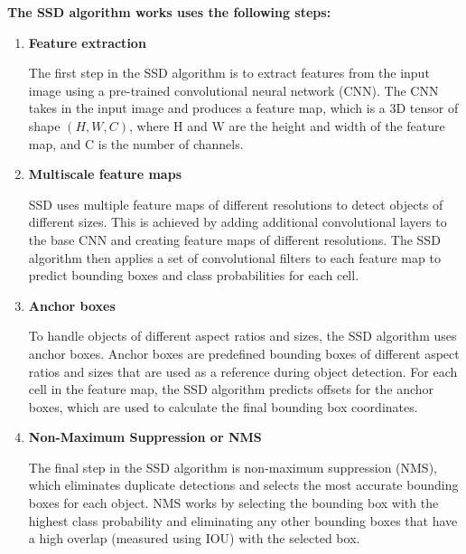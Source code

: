 \textbf{The SSD algorithm works uses the following steps:}
\begin{enumerate}

    \item \textbf{Feature extraction}

          The first step in the SSD algorithm is to extract features from the input image
          using a pre-trained convolutional neural network (CNN). The CNN takes in the
          input image and produces a feature map, which is a 3D tensor of shape \((H, W,
          C)\), where H and W are the height and width of the feature map, and C is the
          number of channels.

    \item \textbf{Multiscale feature maps}

          SSD uses multiple feature maps of different resolutions to detect objects of
          different sizes. This is achieved by adding additional convolutional layers to
          the base CNN and creating feature maps of different resolutions. The SSD
          algorithm then applies a set of convolutional filters to each feature map to
          predict bounding boxes and class probabilities for each cell.

    \item \textbf{Anchor boxes}

          To handle objects of different aspect ratios and sizes, the SSD algorithm uses
          anchor boxes. Anchor boxes are predefined bounding boxes of different aspect
          ratios and sizes that are used as a reference during object detection. For each
          cell in the feature map, the SSD algorithm predicts offsets for the anchor
          boxes, which are used to calculate the final bounding box coordinates.

    \item \textbf{Non-Maximum Suppression or NMS}

          The final step in the SSD algorithm is non-maximum suppression (NMS), which
          eliminates duplicate detections and selects the most accurate bounding boxes
          for each object. NMS works by selecting the bounding box with the highest class
          probability and eliminating any other bounding boxes that have a high overlap
          (measured using IOU) with the selected box.

\end{enumerate}